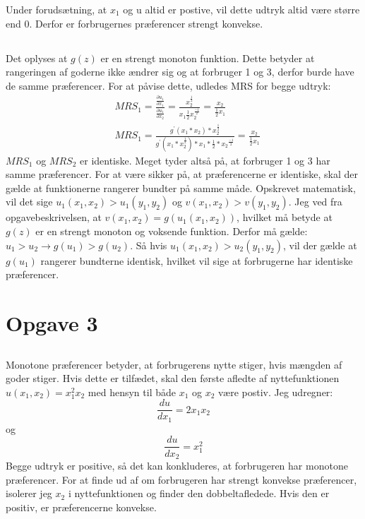 \documentclass{article}
\begin{document}
Under forudsætning, at $x_1$ og u altid er postive, vil dette udtryk altid være større end 0. Derfor er forbrugernes præferencer strengt konvekse. 

\subsection{}
Det oplyses at $g(z)$ er en strengt monoton funktion. Dette betyder at rangeringen af goderne ikke ændrer sig og at forbruger 1 og 3, derfor burde have de samme præferencer. For at påvise dette, udledes MRS for begge udtryk:
$$
\begin{aligned}
& M R S_1=\frac{\frac{\partial u_1}{\partial x_1}}{\frac{\partial u_1}{\partial x_2}}=\frac{x_2^{\frac{1}{2}}}{x_1 \frac{1}{2} x_2^{\frac{-1}{2}}}=\frac{x_2}{\frac{1}{2} x_1} \\
& M R S_1=\frac{g^{\prime}\left(x_1 * x_2\right) * x_2^{\frac{1}{2}}}{g^{\prime}\left(x_1 * x_2^{\frac{1}{2}}\right) * x_1 * \frac{1}{2} * x_2{ }^{\frac{-1}{2}}}=\frac{x_2}{\frac{1}{2} x_1}
\end{aligned}
$$
$MRS_1$ og $MRS_2$ er identiske. Meget tyder altså på, at forbruger 1 og 3 har samme præferencer. For at være sikker på, at præferencerne er identiske, skal der gælde at funktionerne rangerer bundter på samme måde. Opskrevet matematisk, vil det sige $u_1(x_1,x_2)>u_1(y_1,y_2)$ og $v(x_1,x_2)>v(y_1,y_2)$. Jeg ved fra opgavebeskrivelsen, at $v(x_1,x_2)=g(u_1(x_1,x_2))$, hvilket må betyde at $g(z)$ er en strengt monoton og voksende funktion. Derfor må gælde: $u_1>u_2 \rightarrow g(u_1)>g(u_2)$. Så hvis $u_1(x_1,x_2)>u_2(y_1,y_2)$, vil der gælde at $g(u_1)$ rangerer bundterne identisk, hvilket vil sige at forbrugerne har identiske præferencer. 

\section{Opgave 3}
\subsection{}
Monotone præferencer betyder, at forbrugerens nytte stiger, hvis mængden af goder stiger. Hvis dette er tilfædet, skal den første afledte af nyttefunktionen $u(x_1,x_2)=x_1^2x_2$ med hensyn til både $x_1$ og $x_2$ være postiv. Jeg udregner: 
\begin{equation}
    \frac{du}{dx_1}=2x_1x_2
\end{equation}
og
\begin{equation}
    \frac{du}{dx_2}= x_1^2
\end{equation}
Begge udtryk er positive, så det kan konkluderes, at forbrugeren har monotone præferencer. For at finde ud af om forbrugeren har strengt konvekse præferencer, isolerer jeg $x_2$ i nyttefunktionen og finder den dobbeltafledede. Hvis den er positiv, er præferencerne konvekse. 
\end{document}
